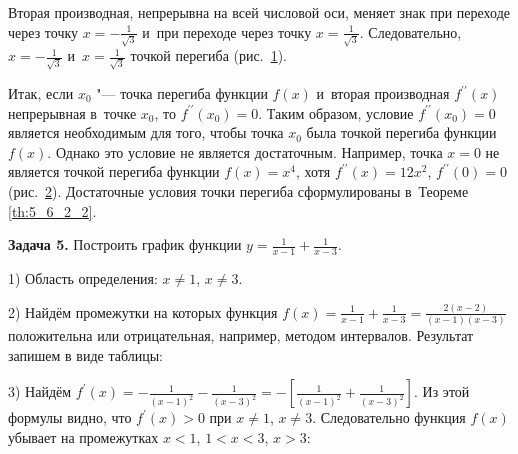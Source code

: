 Вторая производная, непрерывна на всей числовой оси, меняет знак при переходе через точку
$\displaystyle x = -\frac{1}{\sqrt{3}}$ и~при переходе через точку
$\displaystyle x = \frac{1}{\sqrt{3}}$.
Следовательно, $\displaystyle x = -\frac{1}{\sqrt{3}}$
и~$\displaystyle x = \frac{1}{\sqrt{3}}$ точкой перегиба (рис.\ \ref{fig:5_6_2_15}).

\begin{figure}\label{fig:5_6_2_15}
\end{figure}

\begin{figure}\label{fig:5_6_2_16}
\end{figure}

Итак, если $x_{0}$ "--- точка перегиба функции $f(x)$ и~вторая производная
$f^{\prime\prime} (x)$ непрерывная в~точке $x_{0}$, то $f^{\prime\prime} (x_{0}) = 0$.
Таким образом, условие $f^{\prime\prime} (x_{0}) = 0$ является необходимым для того,
чтобы точка $x_{0}$ была точкой перегиба функции $f(x)$.
Однако это условие не является достаточным. Например, точка $x = 0$ не является
точкой перегиба функции $f(x) = x^{4}$, хотя $f^{\prime\prime} (x) = 12x^{2}$,
$f^{\prime\prime} (0) = 0$ (рис.\ \ref{fig:5_6_2_16}).
Достаточные условия точки перегиба сформулированы в~Теореме \ref{th:5_6_2_2}.

\textbf{Задача 5.}\label{ex:5_6_2_5} Построить график функции
$\displaystyle y = \frac{1}{x -1} + \frac{1}{x - 3}$.

1) Область определения: $x \ne 1$, $x \ne 3$.

2) Найдём промежутки на которых функция
$\displaystyle f(x) = \frac{1}{x - 1} + \frac{1}{x - 3} = \frac{2(x-2)}{(x - 1)(x - 3)}$
положительна или отрицательная, например, методом интервалов.
Результат запишем в виде таблицы:


3) Найдём
$\displaystyle f^\prime (x) = -\frac{1}{(x - 1)^{2}} - \frac{1}{(x - 3)^{2}} = 
-\left[ \frac{1}{(x - 1)^{2}} + \frac{1}{(x - 3)^{2}} \right]$.
Из этой формулы видно, что $f^\prime (x) > 0$ при $x \ne 1$, $x \ne 3$.
Следовательно функция $f(x)$ убывает на промежутках $x < 1$, $1 < x <3$, $x > 3$:


